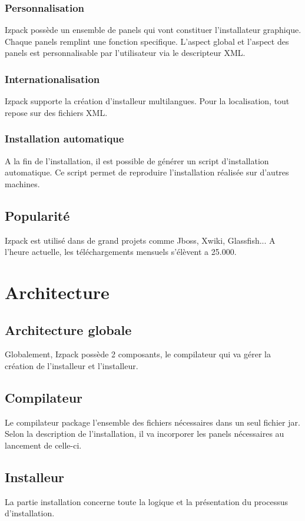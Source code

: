 \subsubsection{Personnalisation}
Izpack possède un ensemble de panels qui vont constituer l'installateur graphique. Chaque panels remplint une fonction specifique. L'aspect global et l'aspect des panels est personnalisable par l'utilisateur via le descripteur XML.
\subsubsection{Internationalisation}
Izpack supporte la création d'installeur multilangues. Pour la localisation, tout repose sur des fichiers XML.
\subsubsection{Installation automatique}
A la fin de l'installation, il est possible de générer un script d'installation automatique. Ce script permet de reproduire l'installation réalisée sur d'autres machines.
\subsection{Popularité}
Izpack est utilisé dans de grand projets comme Jboss, Xwiki, Glassfish... A l'heure actuelle, les téléchargements mensuels s'élèvent a 25.000.
\section{Architecture}
\subsection{Architecture globale}
Globalement, Izpack possède 2 composants, le compilateur qui va gérer la création de l'installeur et l'installeur.
\subsection{Compilateur}
Le compilateur package l'ensemble des fichiers nécessaires dans un seul fichier jar. Selon la description de l'installation, il va incorporer les panels nécessaires au lancement de celle-ci. 
\subsection{Installeur}
La partie installation concerne toute la logique et la présentation du processus d'installation. 

